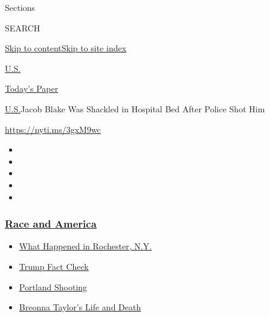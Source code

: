 Sections

SEARCH

\protect\hyperlink{site-content}{Skip to
content}\protect\hyperlink{site-index}{Skip to site index}

\href{https://www.nytimes3xbfgragh.onion/section/us}{U.S.}

\href{https://myaccount.nytimes3xbfgragh.onion/auth/login?response_type=cookie\&client_id=vi}{}

\href{https://www.nytimes3xbfgragh.onion/section/todayspaper}{Today's
Paper}

\href{/section/us}{U.S.}\textbar{}Jacob Blake Was Shackled in Hospital
Bed After Police Shot Him

\url{https://nyti.ms/3gxM9wc}

\begin{itemize}
\item
\item
\item
\item
\item
\end{itemize}

\hypertarget{race-and-america}{%
\subsubsection{\texorpdfstring{\href{https://www.nytimes3xbfgragh.onion/news-event/george-floyd-protests-minneapolis-new-york-los-angeles?name=styln-george-floyd\&region=TOP_BANNER\&block=storyline_menu_recirc\&action=click\&pgtype=Article\&impression_id=6b1e4e80-f282-11ea-930a-29cb1d0340ac\&variant=undefined}{Race
and America}}{Race and America}}\label{race-and-america}}

\begin{itemize}
\tightlist
\item
  \href{https://www.nytimes3xbfgragh.onion/2020/09/04/nyregion/rochester-police-daniel-prude.html?name=styln-george-floyd\&region=TOP_BANNER\&block=storyline_menu_recirc\&action=click\&pgtype=Article\&impression_id=6b1e7590-f282-11ea-930a-29cb1d0340ac\&variant=undefined}{What
  Happened in Rochester, N.Y.}
\item
  \href{https://www.nytimes3xbfgragh.onion/2020/09/01/us/politics/trump-fact-check-protests.html?name=styln-george-floyd\&region=TOP_BANNER\&block=storyline_menu_recirc\&action=click\&pgtype=Article\&impression_id=6b1e7591-f282-11ea-930a-29cb1d0340ac\&variant=undefined}{Trump
  Fact Check}
\item
  \href{https://www.nytimes3xbfgragh.onion/2020/08/30/us/portland-shooting-explained.html?name=styln-george-floyd\&region=TOP_BANNER\&block=storyline_menu_recirc\&action=click\&pgtype=Article\&impression_id=6b1e7592-f282-11ea-930a-29cb1d0340ac\&variant=undefined}{Portland
  Shooting}
\item
  \href{https://www.nytimes3xbfgragh.onion/2020/08/30/us/breonna-taylor-police-killing.html?name=styln-george-floyd\&region=TOP_BANNER\&block=storyline_menu_recirc\&action=click\&pgtype=Article\&impression_id=6b1e7593-f282-11ea-930a-29cb1d0340ac\&variant=undefined}{Breonna
  Taylor's Life and Death}
\end{itemize}

